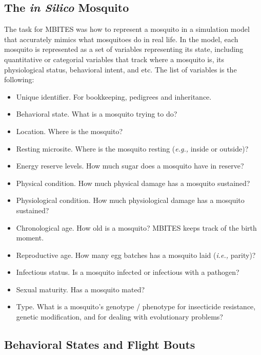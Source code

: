 \documentclass{article}
\newcommand{\eg}{{\em e.g., }}
\newcommand{\ie}{{\em i.e., }}
\begin{document}
\subsection{The {\em in Silico} Mosquito}

The task for MBITES was how to represent a mosquito in a simulation model that accurately mimics what mosquitoes do in real life. In the model, each mosquito is represented as a set of variables representing its state, including quantitative or categorial variables that track where a mosquito is, its physiological status, behavioral intent, and etc. The list of variables is the following: 
%
\begin{itemize}
\item Unique identifier. For bookkeeping, pedigrees and inheritance.
\item Behavioral state. What is a mosquito trying to do?
\item Location. Where is the mosquito? 
\item Resting microsite. Where is the mosquito resting (\eg inside or outside)?
\item Energy reserve levels. How much sugar does a mosquito have in reserve? 
\item Physical condition. How much physical damage has a mosquito sustained? 
\item Physiological condition. How much physiological damage has a mosquito sustained?
\item Chronological age. How old is a mosquito? MBITES keeps track of the birth moment. 
\item Reproductive age. How many egg batches has a mosquito laid (\ie parity)? 
\item Infectious status. Is a mosquito infected or infectious with a pathogen? 
\item Sexual maturity. Has a mosquito mated? 
\item Type. What is a mosquito's genotype / phenotype for insecticide resistance, genetic modification, and for dealing with evolutionary problems? 
\end{itemize}

\subsection{Behavioral States and Flight Bouts}
\end{document}
